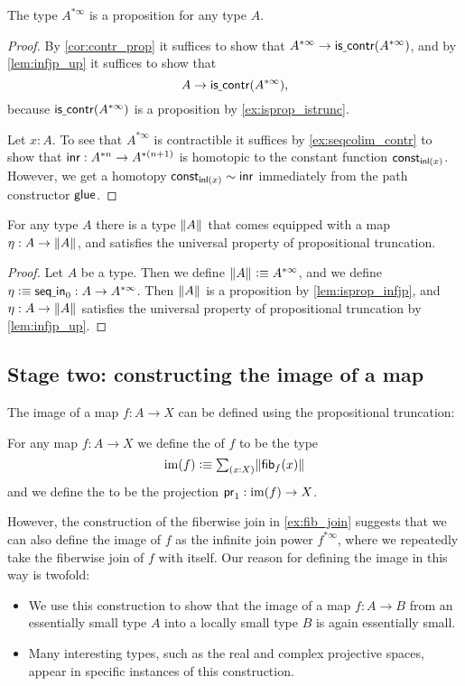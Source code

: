 \begin{lem}\label{lem:isprop_infjp}
The type $A^{\ast\infty}$ is a proposition for any type $A$.
\end{lem}

\begin{proof}
By \cref{cor:contr_prop} it suffices to show that $A^{\ast\infty}\to \mathsf{is\underline{\ }{}contr}(A^{\ast\infty})$, and by \cref{lem:infjp_up} it suffices to show that
\begin{equation*}
A\to \mathsf{is\underline{\ }{}contr}(A^{\ast\infty}),
\end{equation*}
because $\mathsf{is\underline{\ }{}contr}(A^{\ast\infty})$ is a proposition by \cref{ex:isprop_istrunc}. 

Let $x:A$. To see that $A^{\ast\infty}$ is contractible it suffices by \cref{ex:seqcolim_contr} to show that ${\mathsf{inr}}:A^{\ast n}\to A^{\ast(n+1)}$ is homotopic to the constant function $\mathsf{const}_{{\mathsf{inl}}(x)}$. However, we get a homotopy $\mathsf{const}_{{\mathsf{inl}}(x)}\sim {\mathsf{inr}}$ immediately from the path constructor $\mathsf{glue}$.  
\end{proof}

\begin{thm}
For any type $A$ there is a type $\Vert A\Vert_{}$ that comes equipped with a map $\eta:A\to \Vert A\Vert_{}$, and satisfies the universal property of propositional truncation.
\end{thm}

\begin{proof}
Let $A$ be a type. Then we define $\Vert A\Vert_{}\vcentcolon\equiv A^{\ast\infty}$, and we define $\eta\vcentcolon\equiv \mathsf{seq\underline{\ }{}in}_0:A\to A^{\ast\infty}$. Then $\Vert A\Vert_{}$ is a proposition by \cref{lem:isprop_infjp}, and $\eta:A\to \Vert A\Vert_{}$ satisfies the universal property of propositional truncation by \cref{lem:infjp_up}.
\end{proof}

\subsection{Stage two: constructing the image of a map}
The image of a map $f:A\to X$ can be defined using the propositional truncation:
\begin{defn}
For any map $f:A\to X$ we define the  of $f$ to be the type
\begin{equation*}
\im(f) \defeq \sm{x:X}\brck{\fib{f}{x}}
\end{equation*}
and we define the  to be the projection $\mathsf{pr}_{1} :\operatorname{im}(f)\to X$. 
\end{defn}
However, the construction of the fiberwise join in \cref{ex:fib_join} suggests that we can also define the image of $f$ as the infinite join power $f^{\ast\infty}$, where we repeatedly take the fiberwise join of $f$ with itself. Our reason for defining the image in this way is twofold: 
\begin{itemize}
\item We use this construction to show that the image of a map $f:A\to B$ from an essentially small type $A$ into a locally small type $B$ is again essentially small.
\item Many interesting types, such as the real and complex projective spaces, appear in specific instances of this construction.
\end{itemize}

